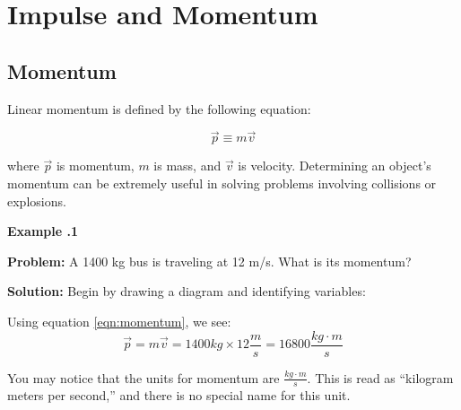 \chapter{Impulse and Momentum}
	\section{Momentum} \label{momentum}  
	Linear momentum is defined by the following equation:
	\begin{mdframed}[backgroundcolor=orange!20!white]
		\begin{equation}
		\vec{p} \equiv m \vec{v} 
		\label{eqn:momentum}
		\end{equation}
	\end{mdframed}
	 where $\vec{p}$ is momentum, $m$ is mass, and $\vec{v} $ is velocity.  Determining an object's momentum can be extremely useful in solving problems involving collisions or explosions.  
	 
	 \begin{mdframed}[backgroundcolor=blue!10!white]
	 	\begin{center}
	 		
	 		
	 		\textbf{Example \thesection.1}	
	 	\end{center}
	 	
	 	\textbf{Problem: } A 1400 kg bus is traveling at 12 m/s.  What is its momentum? 
	 	\vspace{0.1in}
	 	
	 	\textbf{Solution:} 
	 	Begin by drawing a diagram and identifying variables:
	 		 \vspace{0.2in}
	 	
	 	
	 	Using equation \ref{eqn:momentum}, we see:
	 	\begin{equation*}
	 	\vec{p} = m \vec{v} = 1400 kg \times 12 \frac{m}{s} = \boxed{16800 \frac{kg\cdot m}{s}}
	 	\end{equation*}
	 	
	 \end{mdframed}
	 \vspace{0.1in}
	 You may notice that the units for momentum are $\frac{kg \cdot m} {s}$.  This is read as ``kilogram meters per second,'' and there is no special name for this unit.  
	 
